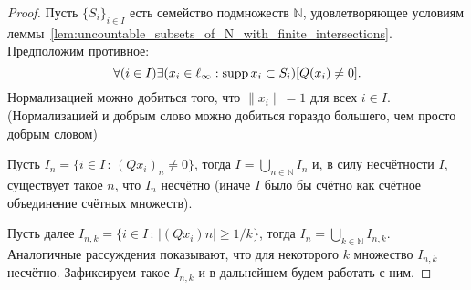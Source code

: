 \begin{proof}
	Пусть $\{S_i\}_{i \in I}$ есть семейство подмножеств $\mathbb{N}$,
	удовлетворяющее условиям леммы~\ref{lem:uncountable_subsets_of_N_with_finite_intersections}.
	Предположим противное:
	\begin{equation}
		\forall(i\in I)\exists(x_i \in \ell_\infty : \operatorname{supp} x_i \subset S_i)[Q(x_i) \neq 0]
		.
	\end{equation}
	Нормализацией можно добиться того, что $\|x_i\|=1$ для всех $i \in I$.
	(Нормализацией и добрым слово можно добиться гораздо большего, чем просто добрым словом)%

	Пусть $I_n = \{i \in I\,:\,(Qx_i)_n \neq 0\}$,
	тогда $I = \bigcup\limits_{n\in\mathbb{N}} I_n$
	и, в силу несчётности $I$, существует такое $n$,
	что $I_n$ несчётно
	(иначе $I$ было бы счётно как счётное объединение счётных множеств).

	Пусть далее $I_{n,k} = \{i \in I\,:\,|(Qx_i)n| \geq 1/k\}$,
	тогда $I_n = \bigcup\limits_{k\in\mathbb{N}} I_{n,k}$.
	Аналогичные рассуждения показывают, что для некоторого $k$ множество $I_{n,k}$ несчётно.
	Зафиксируем такое $I_{n,k}$ и в дальнейшем будем работать с ним.


\end{proof}
